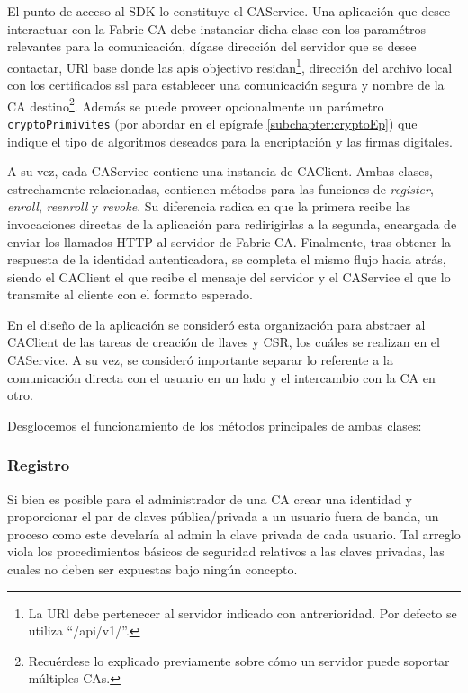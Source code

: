 El punto de acceso al SDK lo constituye el CAService. Una aplicaci\'on que desee interactuar con la Fabric CA debe instanciar dicha clase con los param\'etros relevantes para la comunicaci\'on, d\'igase direcci\'on del servidor que se desee contactar, URl base donde las apis objectivo residan\footnote{La URl debe pertenecer al servidor indicado con antrerioridad. Por defecto se utiliza “/api/v1/”.}, direcci\'on del archivo local con los certificados ssl para establecer una comunicaci\'on segura y nombre de la CA destino\footnote{Recu\'erdese lo explicado previamente sobre c\'omo un servidor puede soportar m\'ultiples CAs.}. Adem\'as se puede  proveer opcionalmente un par\'ametro \texttt{cryptoPrimivites} (por abordar en el ep\'igrafe \ref{subchapter:cryptoEp}) que indique el tipo de algoritmos deseados para la encriptaci\'on y las firmas digitales.

A su vez, cada CAService contiene una instancia de CAClient. Ambas clases, estrechamente relacionadas, contienen m\'etodos para las funciones de \emph{register}, \emph{enroll}, \emph{reenroll} y \emph{revoke}. Su diferencia radica en que la primera recibe las invocaciones directas de la aplicaci\'on para redirigirlas a la segunda, encargada de enviar los llamados HTTP al servidor de Fabric CA. Finalmente, tras obtener la respuesta de la identidad autenticadora, se completa el mismo flujo hacia atr\'as, siendo el CAClient el que recibe el mensaje del servidor y el CAService el que lo transmite al cliente con el formato esperado.

En el dise\~no de la aplicaci\'on se consider\'o esta organizaci\'on para abstraer al CAClient de las tareas de creaci\'on de llaves y CSR, los cu\'ales se realizan en el CAService. A su vez, se consider\'o importante separar lo referente a la comunicaci\'on directa con el usuario en un lado y el intercambio con la CA en otro.

Desglocemos el funcionamiento de los m\'etodos principales de ambas clases:

\subsubsection{Registro}
Si bien es posible para el administrador de una CA crear una identidad y proporcionar el par de claves pública/privada a un usuario fuera de banda, un proceso como este develar\'ia al admin la clave privada de cada usuario. Tal arreglo viola los procedimientos básicos de seguridad relativos a las claves privadas, las cuales no deben ser expuestas bajo ningún concepto.

